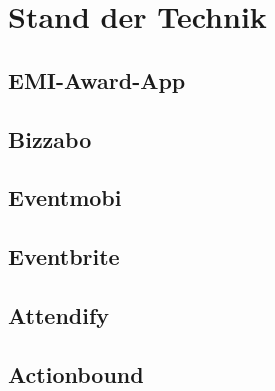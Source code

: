 \chapter{Stand der Technik}

\section{EMI-Award-App}

\section{Bizzabo}

\section{Eventmobi}

\section{Eventbrite}

\section{Attendify}

\section{Actionbound}